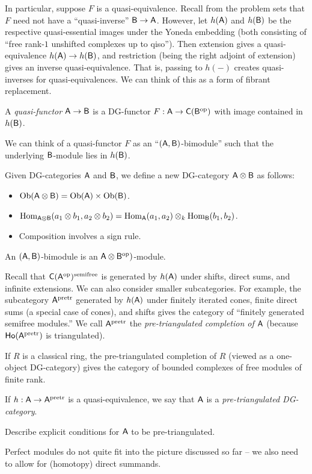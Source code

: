 \documentclass{amsart}
\begin{document}
In particular, suppose $F$ is a quasi-equivalence.
Recall from the problem sets that $F$ need not have a ``quasi-inverse'' $\mathsf{B} \to \mathsf{A}$.
However, let $h(\mathsf{A})$ and $h(\mathsf{B})$ be the respective quasi-essential images under the Yoneda embedding (both consisting of ``free rank-$1$ unshifted complexes up to qiso'').
Then extension gives a quasi-equivalence $h(\mathsf{A}) \to h(\mathsf{B})$, and restriction (being the right adjoint of extension) gives an inverse quasi-equivalence.
That is, passing to $h(-)$ creates quasi-inverses for quasi-equivalences.
We can think of this as a form of fibrant replacement.

\begin{dfn}
	A \emph{quasi-functor} $\mathsf{A} \to \mathsf{B}$ is a DG-functor $F: \mathsf{A} \to \mathsf{C}(\mathsf{B}^{\mathrm{op}})$ with image contained in $h(\mathsf{B})$.
\end{dfn}

We can think of a quasi-functor $F$ as an ``$(\mathsf{A}, \mathsf{B})$-bimodule'' such that the underlying $\mathsf{B}$-module lies in $h(\mathsf{B})$.

\begin{rmk}
	Given DG-categories $\mathsf{A}$ and $\mathsf{B}$, we define a new DG-category $\mathsf{A} \otimes \mathsf{B}$ as follows:
	\begin{itemize}
		\item $\operatorname{Ob} (\mathsf{A} \otimes \mathsf{B}) = \operatorname{Ob} (\mathsf{A}) \times \operatorname{Ob} (\mathsf{B})$.
		\item $\operatorname{Hom}_{\mathsf{A} \otimes \mathsf{B}}(a_1 \otimes b_1, a_2 \otimes b_2) = \operatorname{Hom}_{\mathsf{A}}(a_1, a_2) \otimes_k \operatorname{Hom}_{\mathsf{B}}(b_1, b_2)$.
		\item Composition involves a sign rule.
	\end{itemize}
	An $(\mathsf{A}, \mathsf{B})$-bimodule is an $\mathsf{A} \otimes \mathsf{B}^{\mathrm{op}})$-module.
\end{rmk}

Recall that $\mathsf{C}(\mathsf{A}^{\mathrm{op}})^{\mathrm{semifree}}$ is generated by $h(\mathsf{A})$ under shifts, direct sums, and infinite extensions.
We can also consider smaller subcategories.
For example, the subcategory $\mathsf{A}^{\mathrm{pretr}}$ generated by $h(\mathsf{A})$ under finitely iterated cones, finite direct sums (a special case of cones), and shifts gives the category of ``finitely generated semifree modules.''
We call $\mathsf{A}^{\mathrm{pretr}}$ the \emph{pre-triangulated completion of $\mathsf{A}$} (because $\mathsf{Ho}(\mathsf{A}^{\mathrm{pretr}})$ is triangulated).

\begin{ex}
	If $R$ is a classical ring, the pre-triangulated completion of $R$ (viewed as a one-object DG-category) gives the category of bounded complexes of free modules of finite rank.
\end{ex}

\begin{dfn}
If $h: \mathsf{A} \to \mathsf{A}^{\mathrm{pretr}}$ is a quasi-equivalence, we say that $\mathsf{A}$ is a \emph{pre-triangulated DG-category}.
\end{dfn}

\begin{exer}
	Describe explicit conditions for $\mathsf{A}$ to be pre-triangulated.
\end{exer}

\begin{rmk}
	Perfect modules do not quite fit into the picture discussed so far -- we also need to allow for (homotopy) direct summands.
\end{rmk}
\end{document}
